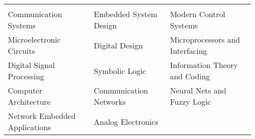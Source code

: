  {} 
\begin{center}
\begin{tabularx}{\textwidth}{X|X|X}
\multicolumn{3}{c}{}\\
Communication Systems     &  Embedded System Design  & Modern Control Systems   \\
Microelectronic Circuits   & Digital Design & Microprocessors and Interfacing  \\
Digital Signal Processing & Symbolic Logic  & Information Theory and Coding \\
Computer Architecture  & Communication Networks & Neural Nets and Fuzzy Logic  \\
Network Embedded Applications & Analog Electronics &  \\

\end{tabularx}
\end{center}

\vspace{2mm}